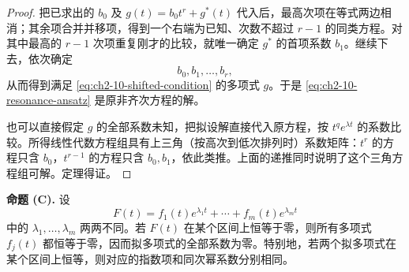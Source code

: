 \begin{proof}
把已求出的 \(b_0\) 及 \(g(t)=b_0t^r+g^*(t)\) 代入后，最高次项在等式两边相消；其余项合并并移项，得到一个右端为已知、次数不超过 \(r-1\) 的同类方程。对其中最高的 \(r-1\) 次项重复刚才的比较，就唯一确定 \(g^*\) 的首项系数 \(b_1\)。继续下去，依次确定
\[
 b_0,b_1,\ldots,b_r,
\]
从而得到满足 \eqref{eq:ch2-10-shifted-condition} 的多项式 \(g\)。于是 \eqref{eq:ch2-10-resonance-ansatz} 是原非齐次方程的解。

也可以直接假定 \(g\) 的全部系数未知，把拟设解直接代入原方程，按 \(t^qe^{\lambda t}\) 的系数比较。所得线性代数方程组具有上三角（按高次到低次排列时）系数矩阵：\(t^r\) 的方程只含 \(b_0\)，\(t^{r-1}\) 的方程只含 \(b_0,b_1\)，依此类推。上面的递推同时说明了这个三角方程组可解。定理得证。
\end{proof}

\medskip
\noindent\textbf{命题 (C).}
设
\begin{equation}
 F(t)=f_1(t)e^{\lambda_1t}+\cdots+f_m(t)e^{\lambda_mt}
 \label{eq:ch2-10-distinct-quasipolynomial}
\end{equation}
中的 \(\lambda_1,\ldots,\lambda_m\) 两两不同。若 \(F(t)\) 在某个区间上恒等于零，则所有多项式 \(f_j(t)\) 都恒等于零，因而拟多项式的全部系数为零。特别地，若两个拟多项式在某个区间上恒等，则对应的指数项和同次幂系数分别相同。

